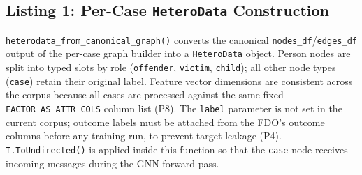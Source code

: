\subsection*{Listing 1: Per-Case \texttt{HeteroData} Construction}
\texttt{heterodata\_from\_canonical\_graph()} converts the canonical
\texttt{nodes\_df}/\texttt{edges\_df} output of the per-case graph builder
into a \texttt{HeteroData} object. Person nodes are split into typed slots by
role (\texttt{offender}, \texttt{victim}, \texttt{child}); all other node
types (\texttt{case}) retain their original label. Feature vector dimensions
are consistent across the corpus because all cases are processed against the
same fixed \texttt{FACTOR\_AS\_ATTR\_COLS} column list (P8). The
\texttt{label} parameter is not set in the current corpus; outcome labels must
be attached from the FDO's outcome columns before any training run, to prevent
target leakage (P4). \texttt{T.ToUndirected()} is applied inside this
function so that the \texttt{case} node receives incoming messages during the
GNN forward pass.

